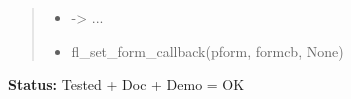 \begin{boxedminipage}{\funcwidth}
\begin{quote}
\begin{itemize}
  \item {\textbar}-{\textgreater}{\textbar} ...



  \item fl\_set\_form\_callback(pform, formcb, None)



\end{itemize}

\end{quote}

\textbf{Status:} Tested + Doc + Demo = OK



    \end{boxedminipage}

    \label{xformslib:flbasic:fl_set_form_callback}

    \vspace{0.5ex}

